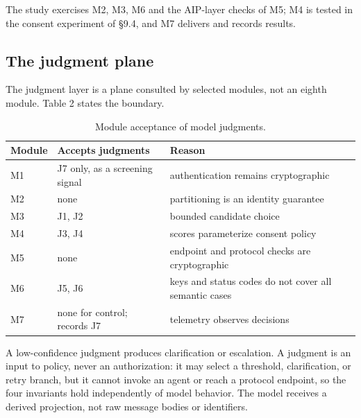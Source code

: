 \documentclass[runningheads,a4paper]{llncs}
\begin{document}
The study exercises M2, M3, M6 and the AIP-layer checks of M5; M4 is tested in the consent experiment of §9.4, and M7 delivers and records results.

\subsection{The judgment plane}

The judgment layer is a plane consulted by selected modules, not an eighth module. Table 2 states the boundary.

\begin{table}[htbp]

\centering

\small

\caption{Module acceptance of model judgments.}\label{tab:2}

\begin{tabularx}{\textwidth}{@{}l>{\raggedright\arraybackslash}X>{\raggedright\arraybackslash}X@{}}

\toprule

\textbf{Module} & \textbf{Accepts judgments} & \textbf{Reason} \\

\midrule

M1 & J7 only, as a screening signal & authentication remains cryptographic \\

M2 & none & partitioning is an identity guarantee \\

M3 & J1, J2 & bounded candidate choice \\

M4 & J3, J4 & scores parameterize consent policy \\

M5 & none & endpoint and protocol checks are cryptographic \\

M6 & J5, J6 & keys and status codes do not cover all semantic cases \\

M7 & none for control; records J7 & telemetry observes decisions \\

\bottomrule

\end{tabularx}

\end{table}

A low-confidence judgment produces clarification or escalation. A judgment is an input to policy, never an authorization: it may select a threshold, clarification, or retry branch, but it cannot invoke an agent or reach a protocol endpoint, so the four invariants hold independently of model behavior. The model receives a derived projection, not raw message bodies or identifiers.
\end{document}
